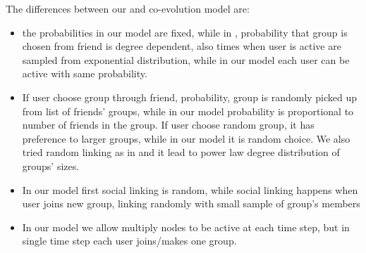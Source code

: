 The differences between our and co-evolution model are:
\begin{itemize}
	\item the probabilities in our model are fixed, while in \cite{zheleva2009co}, probability that group is chosen from friend is degree dependent, also times when user is active are sampled from exponential distribution, while in our model each user can be active with same probability. 
	\item If user choose group through friend, probability, group is randomly picked up from list of friends' groups, while in our model probability is proportional to number of friends in the group. If user choose random group, it has preference to larger groups, while in our model it is random choice. We also tried random linking as in \cite{zheleva2009co} and it lead to power law degree distribution of groups' sizes. 
	\item In our model first social linking is random, while social linking happens when user joins new group, linking randomly with small sample of group's members 
	\item In our model we allow multiply nodes to be active at each time step, but in single time step each user joins/makes one group. 
\end{itemize}


